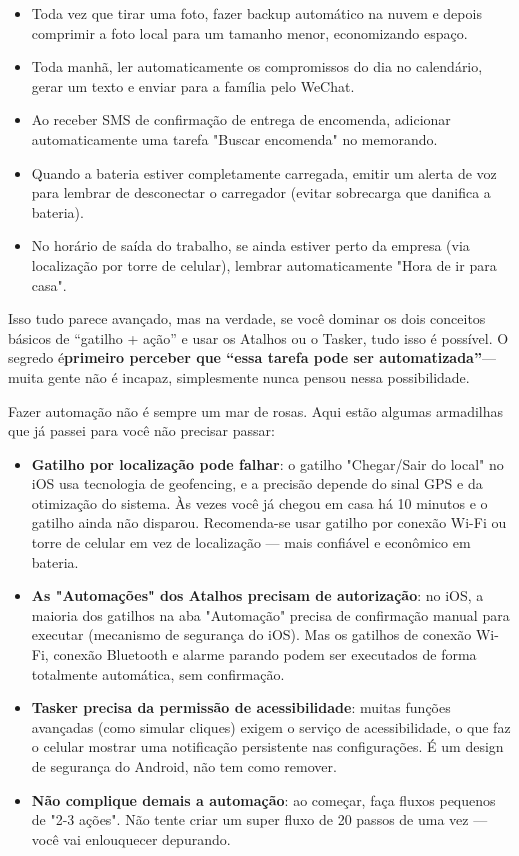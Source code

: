 \begin{itemize}
  \item Toda vez que tirar uma foto, fazer backup automático na nuvem e depois comprimir a foto local para um tamanho menor, economizando espaço.
  \item Toda manhã, ler automaticamente os compromissos do dia no calendário, gerar um texto e enviar para a família pelo WeChat.
  \item Ao receber SMS de confirmação de entrega de encomenda, adicionar automaticamente uma tarefa "Buscar encomenda" no memorando.
  \item Quando a bateria estiver completamente carregada, emitir um alerta de voz para lembrar de desconectar o carregador (evitar sobrecarga que danifica a bateria).
  \item No horário de saída do trabalho, se ainda estiver perto da empresa (via localização por torre de celular), lembrar automaticamente "Hora de ir para casa".
\end{itemize}

Isso tudo parece avançado, mas na verdade, se você dominar os dois conceitos básicos de “gatilho + ação” e usar os Atalhos ou o Tasker, tudo isso é possível. O segredo é\textbf{primeiro perceber que “essa tarefa pode ser automatizada”}— muita gente não é incapaz, simplesmente nunca pensou nessa possibilidade.


Fazer automação não é sempre um mar de rosas. Aqui estão algumas armadilhas que já passei para você não precisar passar:

\begin{itemize}
  \item \textbf{Gatilho por localização pode falhar}: o gatilho "Chegar/Sair do local" no iOS usa tecnologia de geofencing, e a precisão depende do sinal GPS e da otimização do sistema. Às vezes você já chegou em casa há 10 minutos e o gatilho ainda não disparou. Recomenda-se usar gatilho por conexão Wi-Fi ou torre de celular em vez de localização — mais confiável e econômico em bateria.
  \item \textbf{As "Automações" dos Atalhos precisam de autorização}: no iOS, a maioria dos gatilhos na aba "Automação" precisa de confirmação manual para executar (mecanismo de segurança do iOS). Mas os gatilhos de conexão Wi-Fi, conexão Bluetooth e alarme parando podem ser executados de forma totalmente automática, sem confirmação.
  \item \textbf{Tasker precisa da permissão de acessibilidade}: muitas funções avançadas (como simular cliques) exigem o serviço de acessibilidade, o que faz o celular mostrar uma notificação persistente nas configurações. É um design de segurança do Android, não tem como remover.
  \item \textbf{Não complique demais a automação}: ao começar, faça fluxos pequenos de "2-3 ações". Não tente criar um super fluxo de 20 passos de uma vez — você vai enlouquecer depurando.
\end{itemize}

